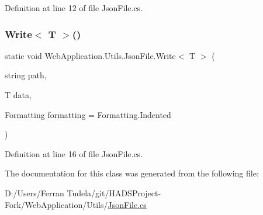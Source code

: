 Definition at line 12 of file Json\+File.\+cs.

\mbox{\label{classWebApplication_1_1Utils_1_1JsonFile_a2d4f23a606776d2a8d5f40a0532ab25b}} 
\subsubsection{\texorpdfstring{Write$<$ T $>$()}{Write< T >()}}
{\footnotesize\ttfamily static void Web\+Application.\+Utils.\+Json\+File.\+Write$<$ T $>$ (\begin{DoxyParamCaption}\item[{string}]{path,  }\item[{T}]{data,  }\item[{Formatting}]{formatting = {\ttfamily Formatting.Indented} }\end{DoxyParamCaption})\hspace{0.3cm}{\ttfamily [static]}}



Definition at line 16 of file Json\+File.\+cs.



The documentation for this class was generated from the following file\+:\begin{DoxyCompactItemize}
\item 
D\+:/\+Users/\+Ferran Tudela/git/\+H\+A\+D\+S\+Project-\/\+Fork/\+Web\+Application/\+Utils/\mbox{\hyperlink{JsonFile_8cs}{Json\+File.\+cs}}\end{DoxyCompactItemize}
